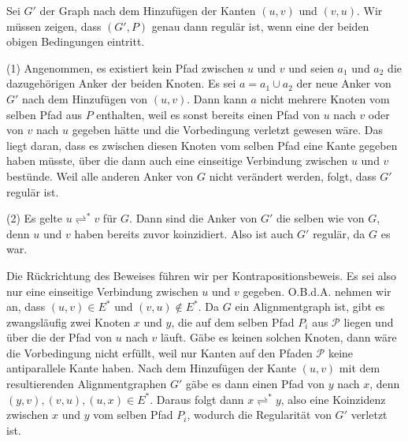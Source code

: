 \begin{beweis}
	Sei $G'$ der Graph nach dem Hinzufügen der Kanten $(u,v)$ und $(v,u)$. Wir müssen zeigen, dass $(G',P)$ genau dann regulär ist, wenn eine der beiden obigen Bedingungen eintritt.
	
	\bewhin (1) Angenommen, es existiert kein Pfad zwischen $u$ und $v$ und seien $a_1$ und $a_2$ die dazugehörigen Anker der beiden Knoten. Es sei $a = a_1 \cup a_2$ der neue Anker von $G'$ nach dem Hinzufügen von $(u,v)$. Dann kann $a$ nicht mehrere Knoten vom selben Pfad aus $P$ enthalten, weil es sonst bereits einen Pfad von $u$ nach $v$ oder von $v$ nach $u$ gegeben hätte und die Vorbedingung verletzt gewesen wäre. Das liegt daran, dass es zwischen diesen Knoten vom selben Pfad eine Kante gegeben haben müsste, über die dann auch eine einseitige Verbindung zwischen $u$ und $v$ bestünde. Weil alle anderen Anker von $G$ nicht verändert werden, folgt, dass $G'$ regulär ist.
	
	(2) Es gelte $u \rightleftharpoons^{*} v$ für $G$. Dann sind die Anker von $G'$ die selben wie von $G$, denn $u$ und $v$ haben bereits zuvor koinzidiert. Also ist auch $G'$ regulär, da $G$ es war.
	
	\bewrueck Die Rückrichtung des Beweises führen wir per Kontrapositionsbeweis. Es sei also nur eine einseitige Verbindung zwischen $u$ und $v$ gegeben. O.B.d.A. nehmen wir an, dass $(u,v) \in E^{*}$ und $(v,u) \notin E^{*}$. Da $G$ ein Alignmentgraph ist, gibt es zwangsläufig zwei Knoten $x$ und $y$, die auf dem selben Pfad $P_i$ aus $\mathcal{P}$ liegen und über die der Pfad von $u$ nach $v$ läuft. Gäbe es keinen solchen Knoten, dann wäre die Vorbedingung nicht erfüllt, weil nur Kanten auf den Pfaden $\mathcal{P}$ keine antiparallele Kante haben. Nach dem Hinzufügen der Kante $(u,v)$ mit dem resultierenden Alignmentgraphen $G'$ gäbe es dann einen Pfad von $y$ nach $x$, denn $(y,v), (v,u), (u,x) \in E^{*}$. Daraus folgt dann $x \rightleftharpoons^{*} y$, also eine Koinzidenz zwischen $x$ und $y$ vom selben Pfad $P_i$, wodurch die Regularität von $G'$ verletzt ist.
\end{beweis}

